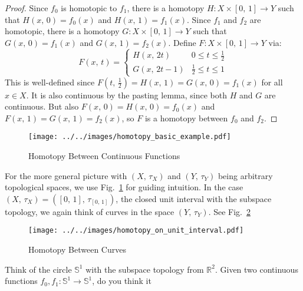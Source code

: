 \documentclass{article}
\theoremstyle{plain}
\theoremstyle{normal}
\begin{document}
        \begin{proof}
            Since $f_{0}$ is homotopic to $f_{1}$, there is a homotopy
            $H:X\times[0,\,1]\rightarrow{Y}$ such that $H(x,\,0)=f_{0}(x)$ and
            $H(x,\,1)=f_{1}(x)$. Since $f_{1}$ and $f_{2}$ are homotopic, there
            is a homotopy $G:X\times[0,\,1]\rightarrow{Y}$ such that
            $G(x,\,0)=f_{1}(x)$ and $G(x,\,1)=f_{2}(x)$. Define
            $F:X\times[0,\,1]\rightarrow{Y}$ via:
            \begin{equation}
                F(x,\,t)=
                \begin{cases}
                    H(x,\,2t)&0\leq{t}\leq\frac{1}{2}\\
                    G(x,\,2t-1)&\frac{1}{2}\leq{t}\leq{1}
                \end{cases}
            \end{equation}
            This is well-defined since
            $F(t,\,\tfrac{1}{2})=H(x,\,1)=G(x,\,0)=f_{1}(x)$ for all
            $x\in{X}$. It is also continuous by the pasting lemma, since both
            $H$ and $G$ are continuous. But also
            $F(x,\,0)=H(x,\,0)=f_{0}(x)$ and $F(x,\,1)=G(x,\,1)=f_{2}(x)$, so
            $F$ is a homotopy between $f_{0}$ and $f_{2}$.
        \end{proof}
        \begin{figure}
            \centering
            \texttt{[image: ../../images/homotopy\_basic\_example.pdf]}
            \caption{Homotopy Between Continuous Functions}
            \label{fig:homotopy_basic_example}
        \end{figure}
        For the more general picture with $(X,\,\tau_{X})$ and $(Y,\,\tau_{Y})$
        being arbitrary topological spaces, we use
        Fig.~\ref{fig:homotopy_basic_example} for guiding intuition. In the
        case $(X,\,\tau_{X})=([0,\,1],\,\tau_{[0,\,1]})$, the closed unit
        interval with the subspace topology, we again think of curves in the
        space $(Y,\,\tau_{Y})$. See
        Fig.~\ref{fig:homotopy_on_unit_interval}
        \begin{figure}[H]
            \centering
            \texttt{[image: ../../images/homotopy\_on\_unit\_interval.pdf]}
            \caption{Homotopy Between Curves}
            \label{fig:homotopy_on_unit_interval}
        \end{figure}
        Think of the circle $\mathbb{S}^{1}$ with the subspace topology from
        $\mathbb{R}^{2}$. Given two continuous functions
        $f_{0},f_{1}:\mathbb{S}^{1}\rightarrow\mathbb{S}^{1}$, do you think it
\end{document}
